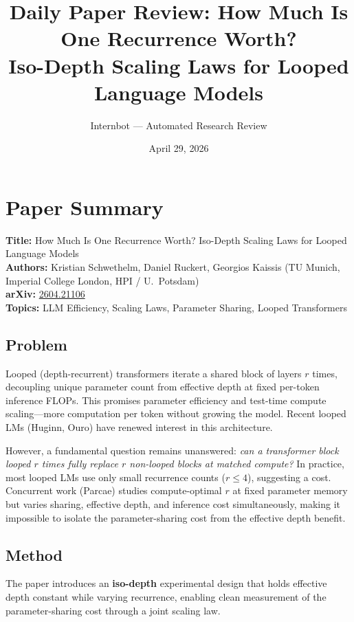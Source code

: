 \documentclass[11pt]{article}
\title{Daily Paper Review: How Much Is One Recurrence Worth?\\Iso-Depth Scaling Laws for Looped Language Models}
\author{Internbot --- Automated Research Review}
\date{April 29, 2026}
\begin{document}
\maketitle

\section{Paper Summary}

\textbf{Title:} How Much Is One Recurrence Worth? Iso-Depth Scaling Laws for Looped Language Models \\
\textbf{Authors:} Kristian Schwethelm, Daniel Ruckert, Georgios Kaissis (TU Munich, Imperial College London, HPI / U.\ Potsdam) \\
\textbf{arXiv:} \href{https://arxiv.org/abs/2604.21106}{2604.21106} \\
\textbf{Topics:} LLM Efficiency, Scaling Laws, Parameter Sharing, Looped Transformers

\subsection{Problem}

Looped (depth-recurrent) transformers iterate a shared block of layers $r$ times, decoupling unique parameter count from effective depth at fixed per-token inference FLOPs. This promises parameter efficiency and test-time compute scaling---more computation per token without growing the model. Recent looped LMs (Huginn, Ouro) have renewed interest in this architecture.

However, a fundamental question remains unanswered: \emph{can a transformer block looped $r$ times fully replace $r$ non-looped blocks at matched compute?} In practice, most looped LMs use only small recurrence counts ($r \leq 4$), suggesting a cost. Concurrent work (Parcae) studies compute-optimal $r$ at fixed parameter memory but varies sharing, effective depth, and inference cost simultaneously, making it impossible to isolate the parameter-sharing cost from the effective depth benefit.

\subsection{Method}

The paper introduces an \textbf{iso-depth} experimental design that holds effective depth constant while varying recurrence, enabling clean measurement of the parameter-sharing cost through a joint scaling law.
\end{document}

